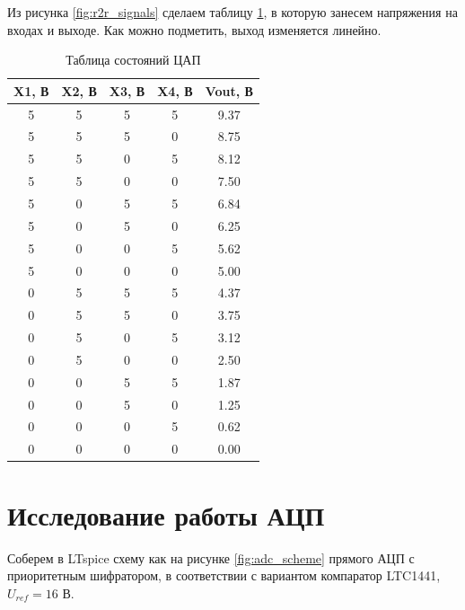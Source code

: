 Из рисунка \ref{fig:r2r_signals} сделаем таблицу \ref{tab:r2r}, в которую
занесем напряжения на входах и выходе. Как можно подметить, выход изменяется линейно.

\begin{table}[H]
    \centering
    \caption{Таблица состояний ЦАП}
    \label{tab:r2r}
    \begin{tabular}{|c|c|c|c|c|}
        \hline
        X1, В & X2, В & X3, В & X4, В & Vout, В \\
        \hline
        5 & 5 & 5 & 5 & 9.37 \\ \hline
        5 & 5 & 5 & 0 & 8.75 \\ \hline
        5 & 5 & 0 & 5 & 8.12 \\ \hline
        5 & 5 & 0 & 0 & 7.50 \\ \hline
        5 & 0 & 5 & 5 & 6.84 \\ \hline
        5 & 0 & 5 & 0 & 6.25 \\ \hline
        5 & 0 & 0 & 5 & 5.62 \\ \hline
        5 & 0 & 0 & 0 & 5.00 \\ \hline
        0 & 5 & 5 & 5 & 4.37 \\ \hline
        0 & 5 & 5 & 0 & 3.75 \\ \hline
        0 & 5 & 0 & 5 & 3.12 \\ \hline
        0 & 5 & 0 & 0 & 2.50 \\ \hline
        0 & 0 & 5 & 5 & 1.87 \\ \hline
        0 & 0 & 5 & 0 & 1.25 \\ \hline
        0 & 0 & 0 & 5 & 0.62 \\ \hline
        0 & 0 & 0 & 0 & 0.00 \\ \hline
    \end{tabular}
\end{table}


\section*{Исследование работы АЦП}

Соберем в LTspice схему как на рисунке \ref{fig:adc_scheme} прямого АЦП с приоритетным 
шифратором, в соответствии с вариантом компаратор LTC1441, $U_{ref}=16$ В.

